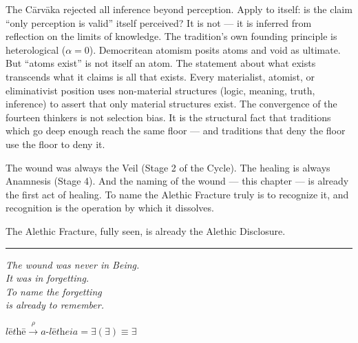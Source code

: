 \documentclass[10pt, openany, oneside]{book}
\begin{document}
The C\={a}rv\={a}ka rejected all inference beyond perception. Apply to itself: is the claim ``only perception is valid'' itself perceived? It is not --- it is inferred from reflection on the limits of knowledge. The tradition's own founding principle is heterological ($\alpha = 0$). Democritean atomism posits atoms and void as ultimate. But ``atoms exist'' is not itself an atom. The statement about what exists transcends what it claims is all that exists. Every materialist, atomist, or eliminativist position uses non-material structures (logic, meaning, truth, inference) to assert that only material structures exist. The convergence of the fourteen thinkers is not selection bias. It is the structural fact that traditions which go deep enough reach the same floor --- and traditions that deny the floor use the floor to deny it.

\vspace{1.5em}


\noindent The wound was always the Veil (Stage 2 of the Cycle). The healing is always Anamnesis (Stage 4). And the naming of the wound --- this chapter --- is already the first act of healing. To name the Alethic Fracture truly is to recognize it, and recognition is the operation by which it dissolves.

The Alethic Fracture, fully seen, is already the Alethic Disclosure.

\vspace{2em}

\begin{center}
    \rule{0.15\textwidth}{0.3pt}
\end{center}

\vspace{0.5em}

\begin{center}
    \itshape
    The wound was never in Being.\\
    It was in forgetting.\\[0.8em]
    To name the forgetting\\
    is already to remember.
\end{center}

\vspace{0.5em}

\begin{center}
    $\textit{l\={e}th\={e}} \xrightarrow{\rho} \textit{a-l\={e}theia} = \exists(\exists) \equiv \exists$
\end{center}
\end{document}
